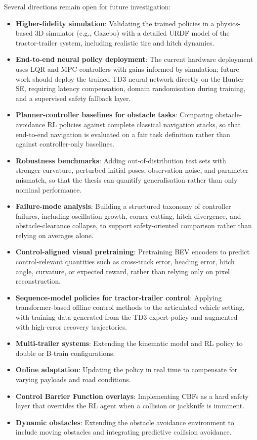 Several directions remain open for future investigation:
\begin{itemize}
    \item \textbf{Higher-fidelity simulation}: Validating the trained policies in a physics-based 3D simulator (e.g., Gazebo) with a detailed URDF model of the tractor-trailer system, including realistic tire and hitch dynamics.
    \item \textbf{End-to-end neural policy deployment}: The current hardware deployment uses LQR and MPC controllers with gains informed by simulation; future work should deploy the trained TD3 neural network directly on the Hunter SE, requiring latency compensation, domain randomisation during training, and a supervised safety fallback layer.
    \item \textbf{Planner-controller baselines for obstacle tasks}: Comparing obstacle-avoidance RL policies against complete classical navigation stacks, so that end-to-end navigation is evaluated on a fair task definition rather than against controller-only baselines.
    \item \textbf{Robustness benchmarks}: Adding out-of-distribution test sets with stronger curvature, perturbed initial poses, observation noise, and parameter mismatch, so that the thesis can quantify generalisation rather than only nominal performance.
    \item \textbf{Failure-mode analysis}: Building a structured taxonomy of controller failures, including oscillation growth, corner-cutting, hitch divergence, and obstacle-clearance collapse, to support safety-oriented comparison rather than relying on averages alone.
    \item \textbf{Control-aligned visual pretraining}: Pretraining BEV encoders to predict control-relevant quantities such as cross-track error, heading error, hitch angle, curvature, or expected reward, rather than relying only on pixel reconstruction.
    \item \textbf{Sequence-model policies for tractor-trailer control}: Applying transformer-based offline control methods to the articulated vehicle setting, with training data generated from the TD3 expert policy and augmented with high-error recovery trajectories.
    \item \textbf{Multi-trailer systems}: Extending the kinematic model and RL policy to double or B-train configurations.
    \item \textbf{Online adaptation}: Updating the policy in real time to compensate for varying payloads and road conditions.
    \item \textbf{Control Barrier Function overlays}: Implementing CBFs as a hard safety layer that overrides the RL agent when a collision or jackknife is imminent.
    \item \textbf{Dynamic obstacles}: Extending the obstacle avoidance environment to include moving obstacles and integrating predictive collision avoidance.
\end{itemize}
